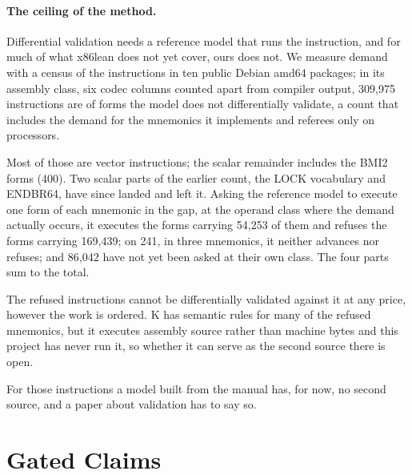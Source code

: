 \documentclass[runningheads]{llncs}
\newcommand{\src}[1]{}  %
\begin{document}
\paragraph{The ceiling of the method.}
Differential validation needs a reference model that runs the instruction, and for much of what
x86lean does not yet cover, ours does not. We measure demand with a census of the instructions in
ten public Debian amd64 packages; in its assembly class, six codec columns counted apart from compiler output,
309{,}975 instructions are of forms the model does not differentially validate, a count that includes the demand for the mnemonics it implements and referees only on processors.
\src{docs/DEMAND-CENSUS.md, the corpus recipe; docs/P2-ROSTER.md header; docs/CLAIMS.tsv[p2\_gap\_total]}
Most of those are vector instructions; the scalar remainder includes the BMI2 forms (400). Two scalar parts of the
earlier count, the LOCK vocabulary and ENDBR64, have since landed and left it.
Asking the reference model to execute one form of each mnemonic in the gap, at the operand class where the
demand actually occurs, it executes the forms carrying 54{,}253 of them and refuses the forms carrying
169{,}439; on 241, in three mnemonics, it neither advances nor refuses; and 86{,}042 have not yet been
asked at their own class. The four parts sum to the total.
\src{docs/P2-ROSTER.md, the additions table and the BY (mnemonic, BUCKET) table; docs/CLAIMS.tsv[p2\_bucket\_executes, p2\_bucket\_refuses, p2\_bucket\_stalls, p2\_bucket\_stalls\_pairs, p2\_bucket\_unasked, p2\_ceiling\_partition\_residue];
54253 + 169439 + 241 + 86042 = 309975}
The refused instructions cannot be differentially validated against it at any price, however the work
is ordered. K has
semantic rules for many of the refused mnemonics, but it executes assembly source rather than machine
bytes and this project has never run it, so whether it can serve as the second source there is open.
\src{docs/DECISIONS.md D115 3 for the finding (its table is dated; the live figures are the roster's);
docs/P2-ROSTER.md, the K operand shapes column; docs/TACAS-G1-POSITIONING.md 1c.8 and its executable row}
For those instructions a model built from the manual has, for now, no second source, and a paper about
validation has to say so.

\section{Gated Claims}
\label{sec:gated}
\end{document}
